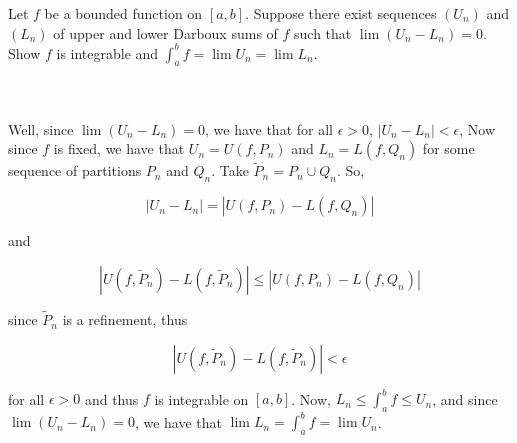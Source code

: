 Let $f$ be a bounded function on $[a,b]$. Suppose there exist sequences $(U_n)$ and $(L_n)$ of upper and
lower Darboux sums of $f$ such that $\lim(U_n-L_n)=0$. Show $f$ is integrable and
$\int_a^bf=\lim U_n=\lim L_n$.\\\\

\begin{solution}\renewcommand{\qedsymbol}{}\ \\
    Well, since $\lim(U_n-L_n)=0$, we have that for all $\epsilon>0$, $|U_n-L_n|<\epsilon$, Now since
    $f$ is fixed, we have that $U_n=U(f,P_n)$ and $L_n=L(f,Q_n)$ for some sequence of partitions $P_n$
    and $Q_n$. Take $\tilde{P}_n=P_n\cup Q_n$. So,
    
    $$|U_n-L_n|=|U(f,P_n)-L(f,Q_n)|$$
    
    and
    
    $$|U(f,\tilde{P}_n)-L(f,\tilde{P}_n)|\leq|U(f,P_n)-L(f,Q_n)|$$
    
    since $\tilde{P}_n$ is a refinement, thus
    
    $$|U(f,\tilde{P}_n)-L(f,\tilde{P}_n)|<\epsilon$$
    
    for all $\epsilon>0$ and thus $f$ is integrable on $[a,b]$. Now, $L_n\leq\int_a^bf\leq U_n$, and
    since $\lim(U_n-L_n)=0$, we have that $\lim L_n=\int_a^bf=\lim U_n$.

\end{solution}